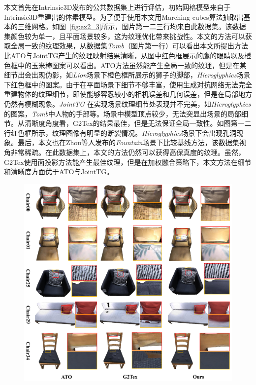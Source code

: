 本文首先在Intrinsic3D发布的公共数据集上进行评估，初始网格模型来自于Intrinsic3D重建出的体素模型。为了便于使用本文用Marching cubes算法抽取出基本的三维网格。如图~\ref{fig:ex2_3}所示，图片第一二三行均来自此数据集。该数据集颜色较为单一，且平面场景较多，这为纹理优化带来挑战性。本文的方法可以获取全局一致的纹理效果，从数据集\emph{Tomb}（图片第一行）可以看出本文所提出方法比ATO与JointTG产生的纹理映射结果清晰，从图中红色框展示的鹰的眼睛以及橙色框中的玉米棒图案可以看出。ATO方法虽然能产生全局一致的纹理，但是在某细节出会出现伪影，如\emph{Lion}场景下橙色框所展示的狮子的脚部，\emph{Hieroglyphics}场景下红色框中的图案。由于在平面场景下细节不够丰富，使用生成对抗网络无法完全重建物体的纹理细节，即使能够容忍较小的相机误差和几何误差，但是在局部地方仍然有模糊现象。\emph{JointTG} 在实现场景纹理细节处表现并不完美，如\emph{Hieroglyphics}的图案，\emph{Tomb}中人物的手部等。场景中模型顶点较少，无法突显出场景的局部细节。从清晰度角度看，G2Tex的结果最佳，但是无法保证全局一致性。如图第一二行红色框所示，纹理图像有明显的断裂情况。\emph{Hieroglyphics}场景下会出现孔洞现象。最后，本文也在Zhou等人发布的\emph{Fountain}场景下比较基线方法，该数据集视角非常稀疏。在此数据集上，本文的方法仍然可以获得高保真度的纹理。虽然，G2Tex使用面投影方法能产生最佳纹理，但是在加权融合策略下，本文方法在细节和清晰度方面优于ATO与JointTG。\par

\begin{figure}[!t]
\centering
\includegraphics[width=1\linewidth]{pic/work2/compare1.pdf}

\label{fig:ex2_1}
\end{figure}

